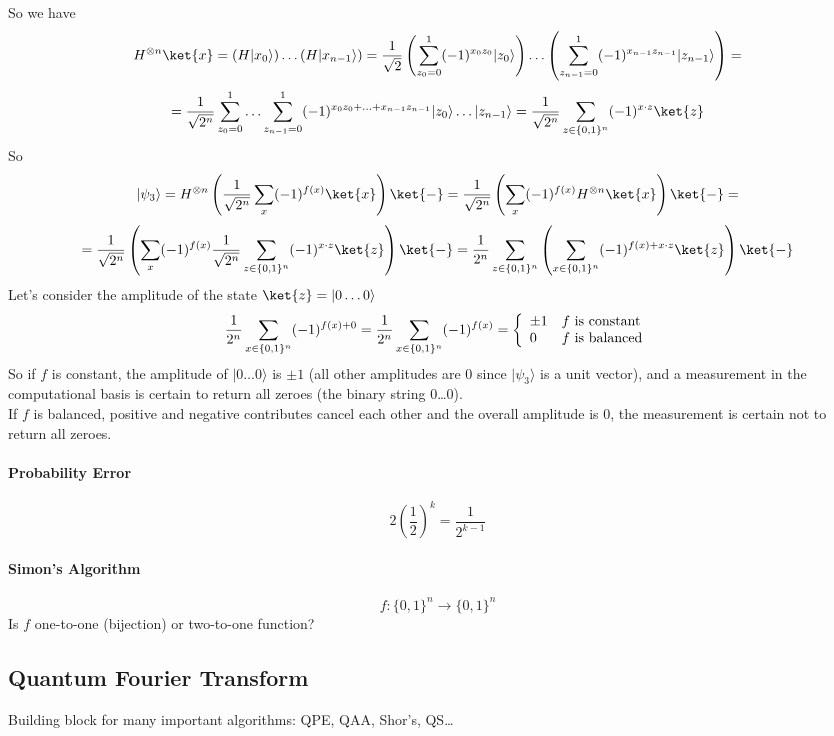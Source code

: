 \documentclass[10pt]{report}
\begin{document}
So we have
$$H^{\otimes n}\ket{x} = (H|x_0\rangle)\ldots(H|x_{n-1}\rangle) = \frac{1}{\sqrt{2}}\left(\sum_{z_0=0}^1(-1)^{x_0z_0}|z_0\rangle\right)\ldots\left(\sum_{z_{n-1}=0}^1(-1)^{x_{n-1}z_{n-1}}|z_{n-1}\rangle\right)=$$
$$=\frac{1}{\sqrt{2^n}} \sum_{z_0=0}^1\ldots\sum_{z_{n-1}=0}^1 (-1)^{x_0z_0+\ldots+x_{n-1}z_{n-1}}|z_0\rangle\ldots|z_{n-1}\rangle = \frac{1}{\sqrt{2^n}}\sum_{z\in\{0,1\}^n} (-1)^{x\cdot z}\ket{z}$$
So
$$|\psi_3\rangle = H^{\otimes n}\left(\frac{1}{\sqrt{2^n}}\sum_x(-1)^{f(x)}\ket{x} \right)\ket{-} = \frac{1}{\sqrt{2^n}}\left(\sum_x (-1)^{f(x)}H^{\otimes n}\ket{x}\right)\ket{-} =$$ $$= \frac{1}{\sqrt{2^n}}\left( \sum_x (-1)^{f(x)}\frac{1}{\sqrt{2^n}}\sum_{z\in\{0,1\}^n}(-1)^{x\cdot z}\ket{z}\right)\ket{-} = \frac{1}{2^n}\sum_{z\in\{0,1\}^n}\left(\sum_{x\in\{0,1\}^n}(-1)^{f(x)+x\cdot z}\ket{z}\right)\ket{-}$$
Let's consider the amplitude of the state $\ket{z} = |0\ldots 0\rangle$
$$\frac{1}{2^n}\sum_{x\in\{0,1\}^n}(-1)^{f(x)+0} = \frac{1}{2^n}\sum_{x\in\{0,1\}^n}(-1)^{f(x)}=\left\{\begin{array}{l l}
\pm1&f\hbox{ is constant}\\
0&f\hbox{ is balanced}\\
\end{array}\right.$$
So if $f$ is constant, the amplitude of $|0\ldots0\rangle$ is $\pm 1$ (all other amplitudes are 0 since $|\psi_3\rangle$ is a unit vector), and a measurement in the computational basis is certain to return all zeroes (the binary string 0\ldots 0).\\
If $f$ is balanced, positive and negative contributes cancel each other and the overall amplitude is 0, the measurement is certain not to return all zeroes.
\paragraph{Probability Error} $$2\left(\frac{1}{2}\right)^k = \frac{1}{2^{k-1}}$$
\paragraph{Simon's Algorithm} $$f:\{0,1\}^n\rightarrow\{0,1\}^n$$
Is $f$ one-to-one (bijection) or two-to-one function?
\subsection{Quantum Fourier Transform}
Building block for many important algorithms: QPE, QAA, Shor's, QS\ldots
\end{document}
